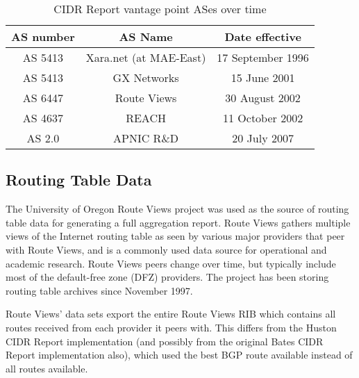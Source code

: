 \begin{table}[h]
    \begin{center}
    \caption{CIDR Report vantage point ASes over time}
    \vspace{1em}
    \begin{tabular}{c | c | c}
        AS number & AS Name & Date effective \\
        \hline
        AS 5413 & Xara.net (at MAE-East) & 17 September 1996 \\
        AS 5413 & GX Networks & 15 June 2001 \\
        AS 6447 & Route Views & 30 August 2002 \\
        AS 4637 & REACH & 11 October 2002 \\
        AS 2.0  & APNIC R\&D & 20 July 2007 \\
    \end{tabular}
    \end{center}
\end{table}

\subsection{Routing Table Data}

The University of Oregon Route Views project \cite{RouteViews} was used as the source of routing table data for generating a full aggregation report. Route Views gathers multiple views of the Internet routing table as seen by various major providers that peer with Route Views, and is a commonly used data source for operational and academic research. Route Views peers change over time, but typically include most of the default-free zone (DFZ) providers. The project has been storing routing table archives since November 1997.

Route Views' data sets export the entire Route Views RIB which contains all routes received from each provider it peers with. This differs from the Huston CIDR Report implementation \cite{Huston interview} (and possibly from the original Bates CIDR Report implementation also), which used the best BGP route available instead of all routes available.



